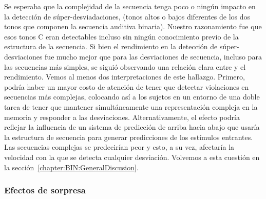 Se esperaba que la complejidad de la secuencia tenga poco o ningún impacto en la detección de súper-desviadaciones, (tonos altos o bajos diferentes de los dos tonos que componen la secuencia auditiva binaria). Nuestro razonamiento fue que esos tonos C eran detectables incluso sin ningún conocimiento previo de la estructura de la secuencia. Si bien el rendimiento en la detección de súper-desviaciones fue mucho mejor que para las desviaciones de secuencia, incluso para las secuencias más simples, se siguió observando una relación clara entre \mdlbin y el rendimiento. Vemos al menos dos interpretaciones de este hallazgo. Primero, podría haber un mayor costo de atención de tener que detectar violaciones en secuencias más complejas, colocando así a los sujetos en un entorno de una doble tarea de tener que mantener simultáneamente una representación compleja en la memoria y responder a las desviaciones. Alternativamente, el efecto podría reflejar la influencia de un sistema de predicción de arriba hacia abajo que usaría la estructura de secuencia para generar predicciones de los estímulos entrantes. Las secuencias complejas se predecirían peor y esto, a su vez, afectaría la velocidad con la que se detecta cualquier desviación. Volvemos a esta cuestión en la sección~\ref{chapter:BIN:GeneralDiscusion}.

\subsubsection*{Efectos de sorpresa}

